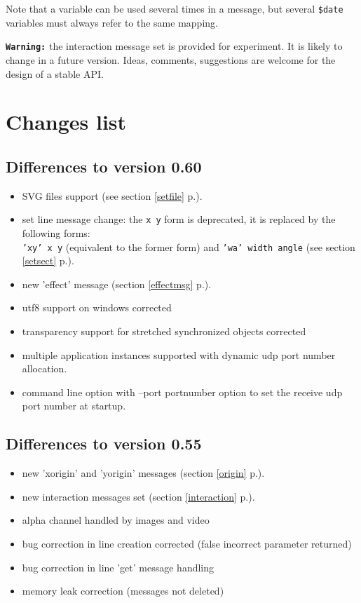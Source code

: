 \documentclass[a4paper,twoside]{report}
\newcommand{\toplevel}[1]	{\chapter{#1}}
\newcommand{\sublevel}[1]	{\section{#1}}
\newcommand{\fullref}[1]	{\ref{#1} p.\pageref{#1}}
\newcommand{\OSC}[1]		{\texttt{#1}}
\begin{document}
Note that a variable can be used several times in a message, but several \OSC{\$date} variables must always refer to the same mapping.

\vspace{5mm}
\texttt{\textbf{Warning:}} the interaction message set is provided for experiment. It is likely to change in a future version. Ideas, comments, suggestions are welcome for the design of a stable API.



\toplevel{ Changes list}

\sublevel{Differences to version 0.60}
\begin{itemize}
\item SVG files support (see section \fullref{setfile}).
\item set line message change: the \OSC{x y} form is deprecated, it is replaced by
  the following forms: \\
  \OSC{'xy' x y} (equivalent to the former form) 
  and \OSC{'wa' width angle}   
  (see section \fullref{setsect}).
\item new 'effect' message  (section \fullref{effectmsg}).
\item utf8 support on windows corrected
\item transparency support for stretched synchronized objects corrected
\item multiple application instances supported with dynamic udp port number allocation.
\item command line option with --port portnumber option to set the receive udp port number at startup.
\end{itemize}

\sublevel{Differences to version 0.55}
\begin{itemize}
\item new 'xorigin' and 'yorigin' messages (section \fullref{origin}).
\item new interaction messages set (section \fullref{interaction}).
\item alpha channel handled by images and video
\item bug correction in line creation corrected (false incorrect parameter returned)
\item bug correction in line 'get' message handling
\item memory leak correction (messages not deleted)
\end{itemize}
\end{document}
